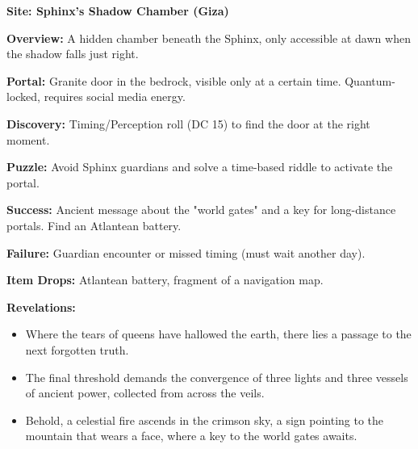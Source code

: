 \documentclass[12pt]{article}
\begin{document}
\textbf{Site: Sphinx's Shadow Chamber (Giza)}

\textbf{Overview:}  
A hidden chamber beneath the Sphinx, only accessible at dawn when the shadow falls just right.

\textbf{Portal:}  
Granite door in the bedrock, visible only at a certain time. Quantum-locked, requires social media energy.

\textbf{Discovery:}  
Timing/Perception roll (DC 15) to find the door at the right moment.

\textbf{Puzzle:}  
Avoid Sphinx guardians and solve a time-based riddle to activate the portal.

\textbf{Success:}  
Ancient message about the "world gates" and a key for long-distance portals. Find an Atlantean battery.

\textbf{Failure:}  
Guardian encounter or missed timing (must wait another day).

\textbf{Item Drops:}  
Atlantean battery, fragment of a navigation map.

\textbf{Revelations:}
\begin{itemize}
  \item Where the tears of queens have hallowed the earth, there lies a passage to the next forgotten truth.
  \item The final threshold demands the convergence of three lights and three vessels of ancient power, collected from across the veils.
  \item Behold, a celestial fire ascends in the crimson sky, a sign pointing to the mountain that wears a face, where a key to the world gates awaits.
\end{itemize}
\end{document}
